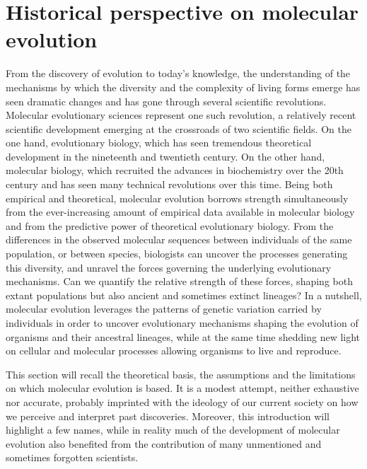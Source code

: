 \thispagestyle{empty}
\chapter{Historical perspective on molecular evolution}
{\hypersetup{linkcolor=GREYDARK}\minitoc}
\label{chap:intro-historical}

From the discovery of evolution to today's knowledge, the understanding of the mechanisms by which the diversity and the complexity of living forms emerge has seen dramatic changes and has gone through several scientific revolutions.
Molecular evolutionary sciences represent one such revolution, a relatively recent scientific development emerging at the crossroads of two scientific fields.
On the one hand, evolutionary biology, which has seen tremendous theoretical development in the nineteenth and twentieth century.
On the other hand, molecular biology, which recruited the advances in biochemistry over the 20th century and has seen many technical revolutions over this time.
Being both empirical and theoretical, molecular evolution borrows strength simultaneously from the ever-increasing amount of empirical data available in molecular biology and from the predictive power of theoretical evolutionary biology.
From the differences in the observed molecular sequences between individuals of the same population, or between species, biologists can uncover the processes generating this diversity, and unravel the forces governing the underlying evolutionary mechanisms.
Can we quantify the relative strength of these forces, shaping both extant populations but also ancient and sometimes extinct lineages?
In a nutshell, molecular evolution leverages the patterns of genetic variation carried by individuals in order to uncover evolutionary mechanisms shaping the evolution of organisms and their ancestral lineages, while at the same time shedding new light on cellular and molecular processes allowing organisms to live and reproduce.

This section will recall the theoretical basis, the assumptions and the limitations on which molecular evolution is based.
It is a modest attempt, neither exhaustive nor accurate, probably imprinted with the ideology of our current society on how we perceive and interpret past discoveries.
Moreover, this introduction will highlight a few names, while in reality much of the development of molecular evolution also benefited from the contribution of many unmentioned and sometimes forgotten scientists.


